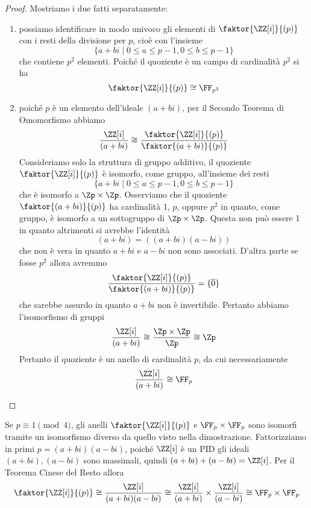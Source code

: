\documentclass[11pt]{scrartcl}
\begin{document}
\begin{proof} 
    Mostriamo i due fatti separatamente:
    \begin{enumerate}[(1)]
        \item possiamo identificare in modo univoco gli elementi di 
        $\faktor{\ZZ[i]}{(p)}$ con i resti della divisione per $p$, cioè
        con l'insieme 
        \[
            \{a + bi \mid 0 \leq a \leq p - 1, 0 \leq b \leq p - 1\}
        \]
        che contiene $p^2$ elementi. Poiché il quoziente è un campo di cardinalità
        $p^2$ si ha
        \[
            \faktor{\ZZ[i]}{(p)}\cong \FF_{p^2}
        \]
        \item poiché $p$ è un elemento dell'ideale $(a + bi)$, per il 
        Secondo Teorema di Omomorfismo abbiamo 
        \[
            \frac{\ZZ[i]}{(a + bi)} \cong \frac{\faktor{\ZZ[i]}{(p)}}{\faktor{(a + bi)}{(p)}}
        \]
        Consideriamo solo la struttura di gruppo additivo, il quoziente 
        $\faktor{\ZZ[i]}{(p)}$ è isomorfo, come gruppo, all'insieme
        dei resti 
        \[
            \{a + bi \mid 0\leq a\leq p - 1, 0\leq b\leq p -1\}
        \]
        che è isomorfo a $\Zp\times\Zp$. Osserviamo che il quoziente
        $\faktor{(a + bi)}{(p)}$ ha cardinalità 1, $p$, oppure $p^2$ in quanto,
        come gruppo, è isomorfo a un sottogruppo di $\Zp\times\Zp$. Questa 
        non può essere 1 in quanto altrimenti si avrebbe l'identità
        \[
            (a + bi) = ((a + bi)(a - bi))
        \]
        che non è vera in quanto $a + bi$ e $a - bi$ non sono associati. D'altra 
        parte se fosse $p^2$ allora avremmo
        \[
            \frac{\faktor{\ZZ[i]}{(p)}}{\faktor{(a + bi)}{(p)}} = \{\overline{0}\}
        \]
        che sarebbe assurdo in quanto $a + bi$ non è invertibile. Pertanto 
        abbiamo l'isomorfismo di gruppi
        \[
            \frac{\ZZ[i]}{(a + bi)} \cong \frac{\Zp \times \Zp}{\Zp} \cong \Zp
        \]
        Pertanto il quoziente è un anello di cardinalità $p$, da cui necessariamente
        \[
            \frac{\ZZ[i]}{(a + bi)} \cong \FF_p
        \]
    \end{enumerate}
\end{proof}

\begin{remark}
    Se $p \equiv 1 \pmod 4$, gli anelli $\faktor{\ZZ[i]}{(p)}$ e $\FF_p \times \FF_p$
    sono isomorfi tramite un isomorfismo diverso da quello visto nella dimostrazione.
    Fattorizziamo in primi $p = (a + bi)(a - bi)$, poiché $\ZZ[i]$ è un PID
    gli ideali $(a + bi), (a - bi)$ sono massimali, quindi $(a + bi) + (a - bi) = \ZZ[i]$.
    Per il Teorema Cinese del Resto allora
    \[
        \faktor{\ZZ[i]}{(p)} \cong \frac{\ZZ[i]}{(a + bi)(a - bi)} \cong
        \frac{\ZZ[i]}{(a + bi)} \times \frac{\ZZ[i]}{(a - bi)} \cong \FF_p \times \FF_p
    \]
\end{remark}
\end{document}
